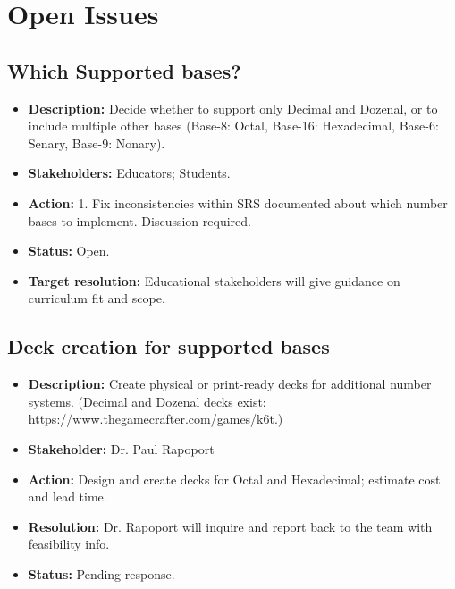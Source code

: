 \documentclass[12pt]{article}
\begin{document}
\section{Open Issues}

\subsection{Which Supported bases?}
  \begin{itemize}
    \item \textbf{Description:} Decide whether to support only Decimal and Dozenal, or to include multiple other bases (Base-8: Octal, Base-16: Hexadecimal, Base-6: Senary, Base-9: Nonary).
    \item \textbf{Stakeholders:} Educators; Students.
    \item \textbf{Action:} 1. Fix inconsistencies within SRS documented about which number bases to implement. Discussion required.
    \item \textbf{Status:} Open.
    \item \textbf{Target resolution:} Educational stakeholders will give guidance on curriculum fit and scope.
  \end{itemize}

\subsection{Deck creation for supported bases}
  \begin{itemize}
    \item \textbf{Description:} Create physical or print-ready decks for additional number systems. (Decimal and Dozenal decks exist:\\
    \url{https://www.thegamecrafter.com/games/k6t}.)
    \item \textbf{Stakeholder:} Dr. Paul Rapoport
    \item \textbf{Action:} Design and create decks for Octal and Hexadecimal; estimate cost and lead time.
    \item \textbf{Resolution:} Dr. Rapoport will inquire and report back to the team with feasibility info.
    \item \textbf{Status:} Pending response.
  \end{itemize}
\end{document}
